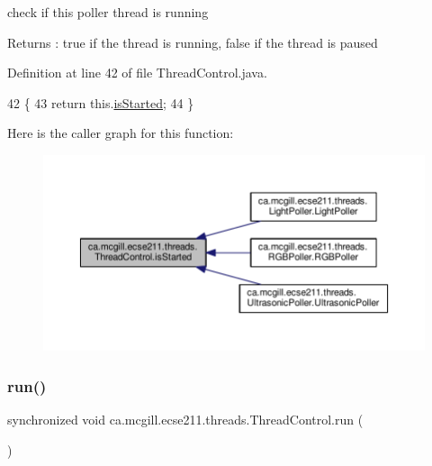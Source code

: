 check if this poller thread is running \begin{DoxyReturn}{Returns}
\+: true if the thread is running, false if the thread is paused 
\end{DoxyReturn}


Definition at line 42 of file Thread\+Control.\+java.


\begin{DoxyCode}
42                                           \{
43     \textcolor{keywordflow}{return} this.\hyperlink{classca_1_1mcgill_1_1ecse211_1_1threads_1_1_thread_control_a92f4933511db42476e39956246bcf2fe}{isStarted};
44   \}
\end{DoxyCode}
Here is the caller graph for this function\+:\nopagebreak
\begin{figure}[H]
\begin{center}
\leavevmode
\includegraphics[width=350pt]{classca_1_1mcgill_1_1ecse211_1_1threads_1_1_thread_control_a92f4933511db42476e39956246bcf2fe_icgraph}
\end{center}
\end{figure}
\mbox{\label{classca_1_1mcgill_1_1ecse211_1_1threads_1_1_thread_control_a03e743000ea2c37080427565e8ec5f35}} 
\subsubsection{\texorpdfstring{run()}{run()}}
{\footnotesize\ttfamily synchronized void ca.\+mcgill.\+ecse211.\+threads.\+Thread\+Control.\+run (\begin{DoxyParamCaption}{ }\end{DoxyParamCaption})}


